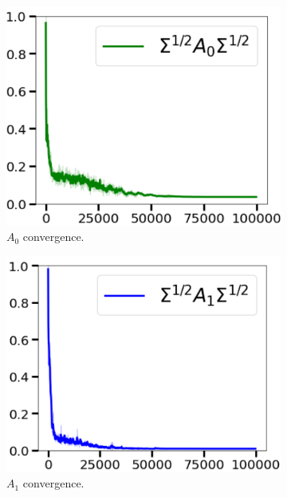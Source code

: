 \documentclass[11pt]{article}
\numberwithin{equation}{section}
\begin{document}
\begin{figure}[htbp]
  \centering
  \begin{subfigure}[b]{0.3\textwidth}
    \centering
    \includegraphics[width=\textwidth]{SigmaA0.png}
    \caption{\( A_0 \) convergence.}
    \label{fig:sigma_a0}
  \end{subfigure}
  \hfill
  \begin{subfigure}[b]{0.3\textwidth}
    \centering
    \includegraphics[width=\textwidth]{SigmaA1.png}
    \caption{\( A_1 \) convergence.}
    \label{fig:sigma_a1}
  \end{subfigure}
  \hfill
  \begin{subfigure}[b]{0.3\textwidth}

\end{subfigure}
\end{figure}
\end{document}
